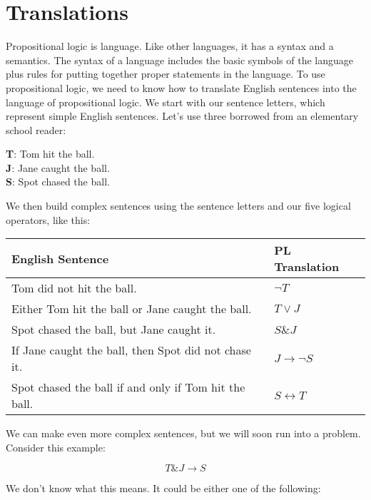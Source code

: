 \section{Translations}\label{translations}

Propositional logic is language. Like other languages, it has a syntax and a semantics. The syntax of a language includes the basic symbols of the language plus rules for putting together proper statements in the language. To use propositional logic, we need to know how to translate English sentences into the language of propositional logic. We start with our sentence letters, which represent simple English sentences. Let's use three borrowed from an elementary school reader:

\medskip
\noindent \textbf{T}: Tom hit the ball.\\
\textbf{J}: Jane caught the ball.\\
\textbf{S}: Spot chased the ball.

We then build complex sentences using the sentence letters and our five logical operators, like this:


\begin{table}[h]
\begin{tabular}{@{}ll@{}}
\toprule
English Sentence                                      & PL Translation           \\ \midrule
Tom did not hit the ball.                             & \(\neg T\)               \\
Either Tom hit the ball or Jane caught the ball.      & \(T \vee J\)             \\
Spot chased the ball, but Jane caught it.             & \(S \mathbin{\&} J\)     \\
If Jane caught the ball, then Spot did not chase it.  & \(J \rightarrow \neg S\) \\
Spot chased the ball if and only if Tom hit the ball. & \(S \leftrightarrow T\)  \\ \bottomrule
\end{tabular}
\end{table}

We can make even more complex sentences, but we will soon run into a problem. Consider this example:

\[ T \mathbin{\&} J \rightarrow S\]

We don't know what this means. It could be either one of the following:

